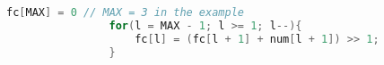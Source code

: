 \documentclass{subfiles}
\begin{document}
    \begin{figure*}[!hb]
        \centering
        \begin{subfigure}{0.5725\textwidth}
            \centering
            \begin{lstlisting}[language=C]
                fc[MAX] = 0 // MAX = 3 in the example
                for(l = MAX - 1; l >= 1; l--){
                    fc[l] = (fc[l + 1] + num[l + 1]) >> 1;
                }
            \end{lstlisting}
        \end{subfigure}
    \end{figure*}
\end{document}
